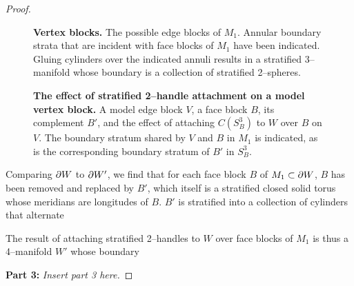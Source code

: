 \begin{proof}
	\begin{figure}[h!]
		\caption{
			\textbf{Vertex blocks.}
			The possible edge blocks of $M_1$.
			Annular boundary strata that are incident with face blocks of $M_1$ have been indicated.
			Gluing cylinders over the indicated annuli results in a stratified 3--manifold whose boundary is a collection of stratified 2--spheres.
		}
		\label{fig:vertex-block-incidence}
	\end{figure}
	
	\begin{figure}[h!]
		\caption{
			\textbf{The effect of stratified 2--handle attachment on a model vertex block.}
			A model edge block $V$, a face block $B$, its complement $B'$, and the effect of attaching $C(S_B^3)$ to $W$ over $B$ on $V$.
			The boundary stratum shared by $V$ and $B$ in $M_1$ is indicated, as is the corresponding boundary stratum of $B'$ in $S_B^3$.
		}
		\label{fig:vertex-face-shared-boundary}
	\end{figure}
	
	Comparing $\partial W$ to $\partial W'$, we find that for each face block $B$ of $M_1\subset \partial W$, $B$ has been removed and replaced by $B'$, which itself is a stratified closed solid torus whose meridians are longitudes of $B$.
	$B'$ is stratified into a collection of cylinders that alternate 
	
	The result of attaching stratified 2--handles to $W$ over face blocks of $M_1$ is thus a 4--manifold $W'$ whose boundary 
	
	\textbf{Part 3:}
	\emph{Insert part 3 here.}
	
\end{proof}
